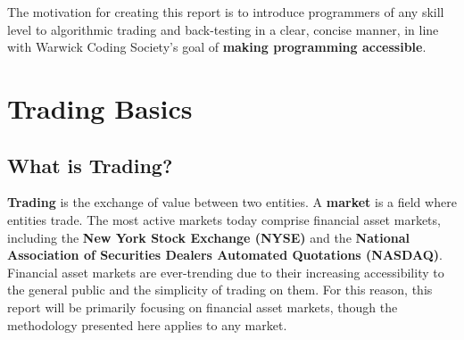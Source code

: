 \documentclass[11pt]{article}
\begin{document}

The motivation for creating this report is to introduce programmers of any skill level to algorithmic trading and back-testing in a clear, concise manner, in line with Warwick Coding Society's goal of \textbf{making programming accessible}.

\section{Trading Basics}

\subsection{What is Trading?}

\textbf{Trading} is the exchange of value between two entities.
A \textbf{market} is a field where entities trade.
The most active markets today comprise financial asset markets, including the \textbf{New York Stock Exchange (NYSE)} and the \textbf{National Association of Securities Dealers Automated Quotations (NASDAQ)}.\\

Financial asset markets are ever-trending due to their increasing accessibility to the general public and the simplicity of trading on them.
For this reason, this report will be primarily focusing on financial asset markets, though the methodology presented here applies to any market.\\
\end{document}
